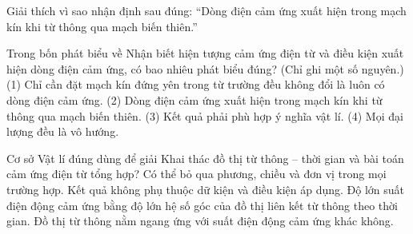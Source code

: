 \begin{bt}
Giải thích vì sao nhận định sau đúng: “Dòng điện cảm ứng xuất hiện trong mạch kín khi từ thông qua mạch biến thiên.”
\end{bt}

\begin{ex}
Trong bốn phát biểu về Nhận biết hiện tượng cảm ứng điện từ và điều kiện xuất hiện dòng điện cảm ứng, có bao nhiêu phát biểu đúng? (Chỉ ghi một số nguyên.) (1) Chỉ cần đặt mạch kín đứng yên trong từ trường đều không đổi là luôn có dòng điện cảm ứng. (2) Dòng điện cảm ứng xuất hiện trong mạch kín khi từ thông qua mạch biến thiên. (3) Kết quả phải phù hợp ý nghĩa vật lí. (4) Mọi đại lượng đều là vô hướng.
\end{ex}

\begin{ex}
Cơ sở Vật lí đúng dùng để giải Khai thác đồ thị từ thông – thời gian và bài toán cảm ứng điện từ tổng hợp?
\choice
{Có thể bỏ qua phương, chiều và đơn vị trong mọi trường hợp.}
{Kết quả không phụ thuộc dữ kiện và điều kiện áp dụng.}
{\True Độ lớn suất điện động cảm ứng bằng độ lớn hệ số góc của đồ thị liên kết từ thông theo thời gian.}
{Đồ thị từ thông nằm ngang ứng với suất điện động cảm ứng khác không.}
\end{ex}

